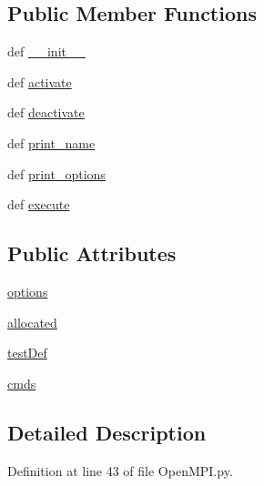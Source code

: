 \subsection*{Public Member Functions}
\begin{DoxyCompactItemize}
\item 
def \hyperlink{classOpenMPI_1_1OpenMPI_a98c85be81f92e692e8087d08c45ebd09}{\-\_\-\-\_\-init\-\_\-\-\_\-}
\item 
def \hyperlink{classOpenMPI_1_1OpenMPI_a446b9a62139dfc9065f4cc21450ed7f9}{activate}
\item 
def \hyperlink{classOpenMPI_1_1OpenMPI_ae235afe3cd4dfc210b7e8d045a108e5b}{deactivate}
\item 
def \hyperlink{classOpenMPI_1_1OpenMPI_a3b39e0c05069fd14533b0a528ac58001}{print\-\_\-name}
\item 
def \hyperlink{classOpenMPI_1_1OpenMPI_a6a912a2ac2d80ba6ac2d6595aa661268}{print\-\_\-options}
\item 
def \hyperlink{classOpenMPI_1_1OpenMPI_a4339bc2f6d52dce9bdd0818e7ce686d2}{execute}
\end{DoxyCompactItemize}
\subsection*{Public Attributes}
\begin{DoxyCompactItemize}
\item 
\hyperlink{classOpenMPI_1_1OpenMPI_a4a263774614f0b83a63a26639b46b2f5}{options}
\item 
\hyperlink{classOpenMPI_1_1OpenMPI_a9ffab4795264fde34d136269026204db}{allocated}
\item 
\hyperlink{classOpenMPI_1_1OpenMPI_acd20b78013350c2363484589ef85b67c}{test\-Def}
\item 
\hyperlink{classOpenMPI_1_1OpenMPI_a86be93bbc775c81263813274a8564efc}{cmds}
\end{DoxyCompactItemize}


\subsection{Detailed Description}


Definition at line 43 of file Open\-M\-P\-I.\-py.



